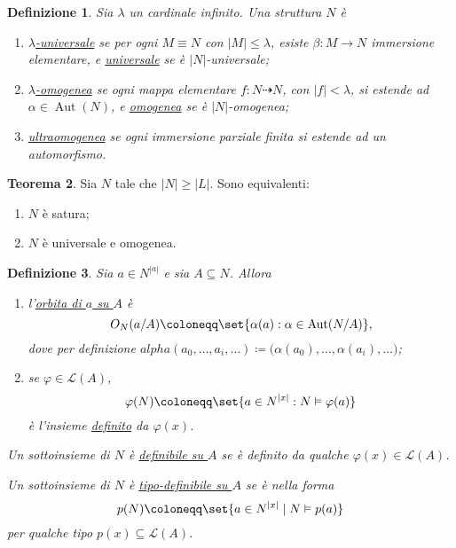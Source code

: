 \documentclass[10pt]{article}
\newcommand{\card}[1]{\left\vert #1 \right\vert}
\newcommand{\1}{\mathds{1}}
\newcommand{\partialto}{\dashrightarrow}
\theoremstyle{definition}%
\newtheorem{thm}{Teorema}[section]
\theoremstyle{plain}
\newtheorem{definizione}[thm]{Definizione}
\theoremstyle{remark}
\begin{document}
\begin{definizione}
Sia \(\lambda\) un cardinale infinito. Una struttura \(N\) è
\begin{enumerate}
\item \uline{\(\lambda\)-universale} se per ogni \(M\equiv N\) con \(\card{M}\le \lambda\), esiste \(\beta:M\to N\) immersione elementare, e \uline{universale} se è \(\card{N}\)-universale;
\item \uline{\(\lambda\)-omogenea} se ogni mappa elementare \(f:N\partialto N\), con \(\card{f}<\lambda\), si estende ad \(\alpha \in \operatorname{Aut}(N)\), e \uline{omogenea} se è \(\card{N}\)-omogenea;
\item \uline{ultraomogenea} se ogni immersione parziale finita si estende ad un automorfismo.
\end{enumerate}
\end{definizione}

\begin{thm}
Sia \(N\) tale che \(\card{N}\ge \card{L}\). Sono equivalenti:
\begin{enumerate}
\item \(N\) è satura;
\item \(N\) è universale e omogenea.
\end{enumerate}
\end{thm}

\begin{definizione}
Sia \(a \in N^{|a|}\) e sia \(A \subseteq N\). Allora
\begin{enumerate}
\item l'\uline{orbita di \(a\) su \(A\)} è
\begin{equation*}
 O_{N}(a/A) \coloneqq \set{\alpha(a): \alpha \in \operatorname{Aut}(N/A)},
\end{equation*}
dove per definizione \(alpha(a_{0},\dots,a_{i},\dots) \coloneqq \big(\alpha(a_{0}),\dots,\alpha(a_{i}),\dots\big)\);
\item se \(\varphi \in \mathcal{L}(A)\),
\begin{equation*}
 \varphi(N) \coloneqq \set{a \in N^{|x|}:N\vDash\varphi(a)}
\end{equation*}
è l'insieme \uline{definito} da \(\varphi(x)\).
\end{enumerate}

Un sottoinsieme di \(N\) è \uline{definibile su \(A\)} se è definito da qualche \(\varphi(x) \in \mathcal{L}(A)\).

Un sottoinsieme di \(N\) è \uline{tipo-definibile su \(A\)} se è nella forma
\begin{equation*}
p(N) \coloneqq \set{a \in N^{|x|}\mid N\vDash p(a)}
\end{equation*}
per qualche tipo \(p(x) \subseteq \mathcal{L}(A)\).
\end{definizione}
\end{document}
